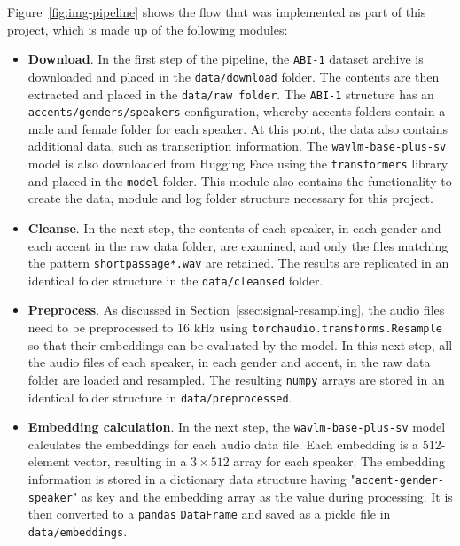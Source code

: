 \documentclass[conference]{IEEEtran}
\begin{document}
	Figure~\ref{fig:img-pipeline} shows the flow that was implemented as part of this project, which is made up of the following modules:
	
	\begin{itemize}
		\item \textbf{Download}. In the first step of the pipeline, the \texttt{ABI-1} dataset archive is downloaded and placed in the \texttt{data/download} folder. The contents are then extracted and placed in the \texttt{data/raw folder}. The \texttt{ABI-1} structure has an \texttt{accents/genders/speakers} configuration, whereby accents folders contain a male and female folder for each speaker. At this point, the data also contains additional data, such as transcription information.
		The \texttt{wavlm-base-plus-sv} model is also downloaded from Hugging Face using the \texttt{transformers} library and placed in the \texttt{model} folder.
		This module also contains the functionality to create the data, module and log folder structure necessary for this project.
		
		\item \textbf{Cleanse}. In the next step, the contents of each speaker, in each gender and each accent in the raw data folder, are examined, and only the files matching the pattern \texttt{shortpassage*.wav} are retained. The results are replicated in an identical folder structure in the \texttt{data/cleansed} folder.
		
		\item \textbf{Preprocess}. As discussed in Section~\ref{ssec:signal-resampling}, the audio files need to be preprocessed to 16 kHz using \texttt{torchaudio.transforms.Resample} so that their embeddings can be evaluated by the model. In this next step, all the audio files of each speaker, in each gender and accent, in the raw data folder are loaded and resampled. The resulting \texttt{numpy} arrays are stored in an identical folder structure in \texttt{data/preprocessed}.
		
		\item \textbf{Embedding calculation}. In the next step, the \texttt{wavlm-base-plus-sv} model calculates the embeddings for each audio data file. Each embedding is a 512-element vector, resulting in a $3 \times 512$ array for each speaker. The embedding information is stored in a dictionary data structure having "\texttt{accent-gender-speaker}" as key and the embedding array as the value during processing. It is then converted to a \texttt{pandas} \texttt{DataFrame} and saved as a pickle file in \texttt{data/embeddings}.
		

\end{itemize}
\end{document}
